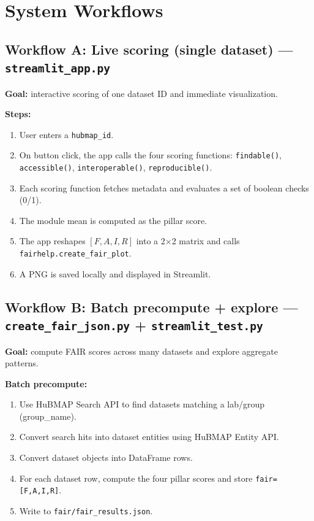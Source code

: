 \documentclass[11pt]{article}
\begin{document}
\section{System Workflows}
\subsection{Workflow A: Live scoring (single dataset) --- \texttt{streamlit\_app.py}}
\textbf{Goal:} interactive scoring of one dataset ID and immediate visualization.

\textbf{Steps:}
\begin{enumerate}[leftmargin=2em]
  \item User enters a \texttt{hubmap\_id}.
  \item On button click, the app calls the four scoring functions:
  \texttt{findable()}, \texttt{accessible()}, \texttt{interoperable()}, \texttt{reproducible()}.
  \item Each scoring function fetches metadata and evaluates a set of boolean checks (0/1).
  \item The module mean is computed as the pillar score.
  \item The app reshapes \([F, A, I, R]\) into a 2$\times$2 matrix and calls \texttt{fairhelp.create\_fair\_plot}.
  \item A PNG is saved locally and displayed in Streamlit.
\end{enumerate}

\subsection{Workflow B: Batch precompute + explore --- \texttt{create\_fair\_json.py} + \texttt{streamlit\_test.py}}
\textbf{Goal:} compute FAIR scores across many datasets and explore aggregate patterns.

\textbf{Batch precompute:}
\begin{enumerate}[leftmargin=2em]
  \item Use HuBMAP Search API to find datasets matching a lab/group (group\_name).
  \item Convert search hits into dataset entities using HuBMAP Entity API.
  \item Convert dataset objects into DataFrame rows.
  \item For each dataset row, compute the four pillar scores and store \texttt{fair=[F,A,I,R]}.
  \item Write to \texttt{fair/fair\_results.json}.
\end{enumerate}
\end{document}
